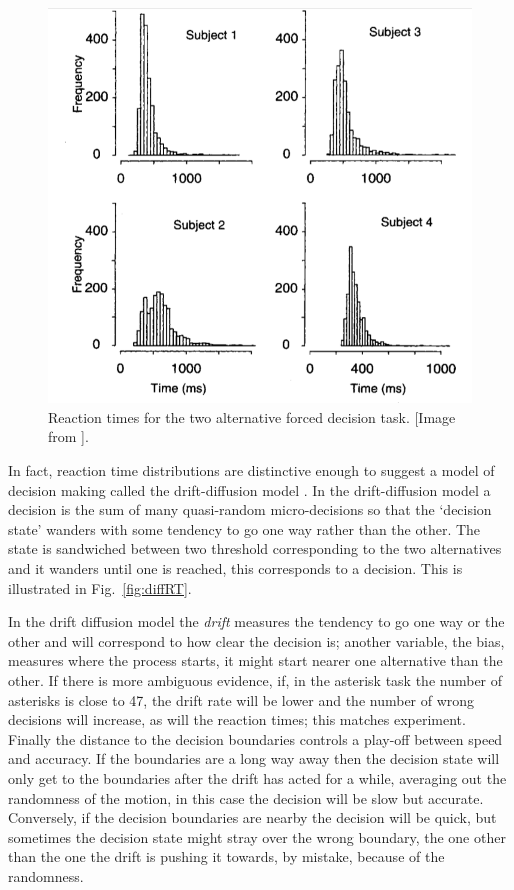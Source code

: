 \documentclass[11pt,a4paper]{scrartcl}
\begin{document}
\begin{figure}
\begin{center}
\includegraphics[width=12cm]{RT.png}
\end{center}
\caption{Reaction times for the two alternative forced decision task. [Image from \cite{RatcliffVanZandtMcKoon1999a}].\label{fig:RT}}
\end{figure}

In fact, reaction time distributions are distinctive enough to suggest
a model of decision making called the drift-diffusion model
\cite{Ratcliff1978a,Ratcliff1979a}. In the drift-diffusion model a
decision is the sum of many quasi-random micro-decisions so that the
\lq{}decision state\rq{} wanders with some tendency to go one way
rather than the other. The state is sandwiched between two threshold
corresponding to the two alternatives and it wanders until one is
reached, this corresponds to a decision. This is illustrated in
Fig.~\ref{fig:diffRT}. 

In the drift diffusion model the \textsl{drift} measures the tendency
to go one way or the other and will correspond to how clear the
decision is; another variable, the bias, measures where the process
starts, it might start nearer one alternative than the other. If there
is more ambiguous evidence, if, in the asterisk task the number of
asterisks is close to 47, the drift rate will be lower and the number
of wrong decisions will increase, as will the reaction times; this
matches experiment. Finally the distance to the decision boundaries
controls a play-off between speed and accuracy. If the boundaries are
a long way away then the decision state will only get to the
boundaries after the drift has acted for a while, averaging out the
randomness of the motion, in this case the decision will be slow but
accurate. Conversely, if the decision boundaries are nearby the
decision will be quick, but sometimes the decision state might stray
over the wrong boundary, the one other than the one the drift is
pushing it towards, by mistake, because of the randomness.
\end{document}
